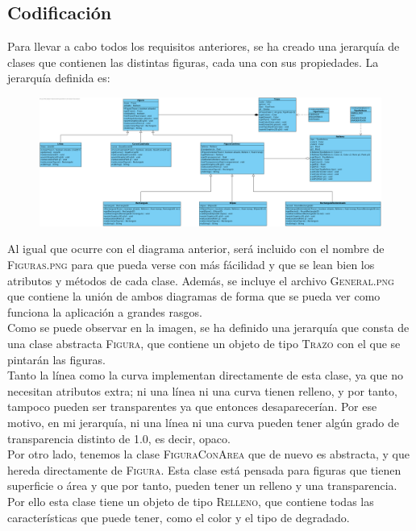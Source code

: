 \documentclass[11pt,a4paper]{article}
\begin{document}
\subsection{Codificación}
Para llevar a cabo todos los requisitos anteriores, se ha creado una jerarquía de clases que contienen las distintas figuras, cada una con sus propiedades. La jerarquía definida es:

\begin{figure}[H]
\centering
	\includegraphics[scale=0.3]{./UML/figuras.png}
\end{figure}

Al igual que ocurre con el diagrama anterior, será incluido con el nombre de \textsc{Figuras.png} para que pueda verse con más fácilidad y que se lean bien los atributos y métodos de cada clase. Además, se incluye el archivo \textsc{General.png} que contiene la unión de ambos diagramas de forma que se pueda ver como funciona la aplicación a grandes rasgos.\\

Como se puede observar en la imagen, se ha definido una jerarquía que consta de una clase abstracta \textsc{Figura}, que contiene un objeto de tipo \textsc{Trazo} con el que se pintarán las figuras.\\

Tanto la línea como la curva implementan directamente de esta clase, ya que no necesitan atributos extra; ni una línea ni una curva tienen relleno, y por tanto, tampoco pueden ser transparentes ya que entonces desaparecerían. Por ese motivo, en mi jerarquía, ni una línea ni una curva pueden tener algún grado de transparencia distinto de 1.0, es decir, opaco.\\

Por otro lado, tenemos la clase \textsc{FiguraConArea} que de nuevo es abstracta, y que hereda directamente de \textsc{Figura}. Esta clase está pensada para figuras que tienen superficie o área y que por tanto, pueden tener un relleno y una transparencia. Por ello esta clase tiene un objeto de tipo \textsc{Relleno}, que contiene todas las características que puede tener, como el color y el tipo de degradado.\\
\end{document}
